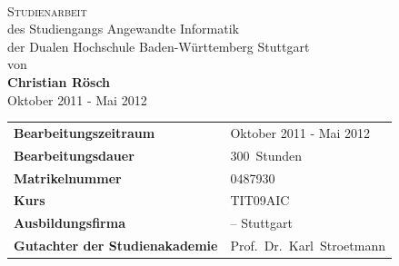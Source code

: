 \thispagestyle{empty}


\begin{center}
	\vspace{15mm}	{\LARGE\bf\thema}\\
	\vspace{20mm}	{\Large\textsc{Studienarbeit}}\\
	\vspace{15mm}	des Studiengangs Angewandte Informatik\\der Dualen Hochschule Baden-Württemberg Stuttgart\\
	\vspace{7,5mm}	von\\
	\vspace{7,5mm}	{\textbf{Christian Rösch}}\\
	\vspace{10mm}	Oktober 2011 - Mai 2012
\end{center}

\vfill

\begin{tabular*}{\textwidth}{p{7cm}l}
  \textbf{Bearbeitungszeitraum} &  Oktober 2011 - Mai 2012\\
  \textbf{Bearbeitungsdauer}    &  300~Stunden\\
  \textbf{Matrikelnummer}       &  0487930\\
  \textbf{Kurs}                	&  TIT09AIC\\
  \textbf{Ausbildungsfirma}     &  \icon{} -- Stuttgart\\
  \textbf{Gutachter der Studienakademie} & Prof.~Dr.~Karl~Stroetmann\\
\end{tabular*}